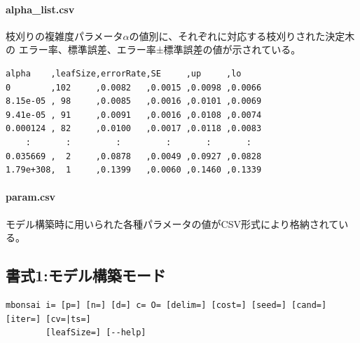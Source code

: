 \paragraph{alpha\_list.csv}
枝刈りの複雑度パラメータ$\alpha$の値別に、それぞれに対応する枝刈りされた決定木の
エラー率、標準誤差、エラー率±標準誤差の値が示されている。
\begin{Verbatim}[baselinestretch=0.7,frame=single]
alpha    ,leafSize,errorRate,SE     ,up     ,lo
0        ,102     ,0.0082   ,0.0015 ,0.0098 ,0.0066
8.15e-05 , 98     ,0.0085   ,0.0016 ,0.0101 ,0.0069
9.41e-05 , 91     ,0.0091   ,0.0016 ,0.0108 ,0.0074
0.000124 , 82     ,0.0100   ,0.0017 ,0.0118 ,0.0083
    :       :         :         :       :       : 
0.035669 ,  2     ,0.0878   ,0.0049 ,0.0927 ,0.0828
1.79e+308,  1     ,0.1399   ,0.0060 ,0.1460 ,0.1339
\end{Verbatim}

\paragraph{param.csv}
モデル構築時に用いられた各種パラメータの値がCSV形式により格納されている。

\newpage
\subsection{書式1:モデル構築モード}
\begin{verbatim}
mbonsai i= [p=] [n=] [d=] c= O= [delim=] [cost=] [seed=] [cand=] [iter=] [cv=|ts=]
        [leafSize=] [--help]
\end{verbatim}

